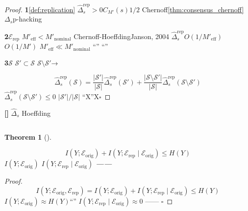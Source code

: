 \documentclass[11pt,a4paper]{article}
\newtheorem{theorem}{Theorem}[section]
\theoremstyle{remark}
\newcommand{\rigorous}{\textnormal{\textbf{[]}}}
\begin{document}
\begin{proof}
\textbf{1}\ref{def:replication}
$\hat{\Delta}_s^{\text{rep}} > 0$$C_{M'}(s)$$1/2$
Chernoff\ref{thm:consensus_chernoff}
\textbf{}$\Delta_s$p-hacking


\textbf{2}$\mathcal{E}_{\text{rep}}$
$M'_{\text{eff}} < M'_{\text{nominal}}$
Chernoff-HoeffdingJanson, 2004
$\hat{\Delta}_s^{\text{rep}}$$O(1/M'_{\text{eff}})$$O(1/M')$
$M'_{\text{eff}} \ll M'_{\text{nominal}}$
\textbf{}``''
``''

\textbf{3}$\mathcal{S}$
$\mathcal{S}' \subset \mathcal{S}$
$\mathcal{S} \setminus \mathcal{S}'$→

\begin{equation}
    \hat{\Delta}_s^{\text{rep}}(\mathcal{S}) =
    \frac{|\mathcal{S}'|}{|\mathcal{S}|}\hat{\Delta}_s^{\text{rep}}(\mathcal{S}') +
    \frac{|\mathcal{S} \setminus \mathcal{S}'|}{|\mathcal{S}|}\hat{\Delta}_s^{\text{rep}}(\mathcal{S} \setminus \mathcal{S}')
\end{equation}
$\hat{\Delta}_s^{\text{rep}}(\mathcal{S} \setminus \mathcal{S}') \leq 0$
$|\mathcal{S}'|/|\mathcal{S}|$
\textbf{}``X''X\hfill $\square$
\end{proof}

\rigorous{} \textbf{}$\hat{\Delta}_s$
Hoeffding

\subsection{}

\begin{theorem}[]
\label{thm:replication_roots}

\begin{equation}
    \boxed{I(Y; \mathcal{E}_{\text{orig}}) + I(Y; \mathcal{E}_{\text{rep}} \mid \mathcal{E}_{\text{orig}})
    \leq H(Y)}
\end{equation}
$I(Y; \mathcal{E}_{\text{orig}})$
$I(Y; \mathcal{E}_{\text{rep}} \mid \mathcal{E}_{\text{orig}})$
\textbf{——}
\end{theorem}

\begin{proof}

\begin{equation}
    I(Y; \mathcal{E}_{\text{orig}}, \mathcal{E}_{\text{rep}})
    = I(Y; \mathcal{E}_{\text{orig}}) + I(Y; \mathcal{E}_{\text{rep}} \mid \mathcal{E}_{\text{orig}})
    \leq H(Y)
\end{equation}
$I(Y; \mathcal{E}_{\text{orig}}) \approx H(Y)$``''
$I(Y; \mathcal{E}_{\text{rep}} \mid \mathcal{E}_{\text{orig}}) \approx 0$
\textbf{}——
\hfill $\square$
\end{proof}
\end{document}
